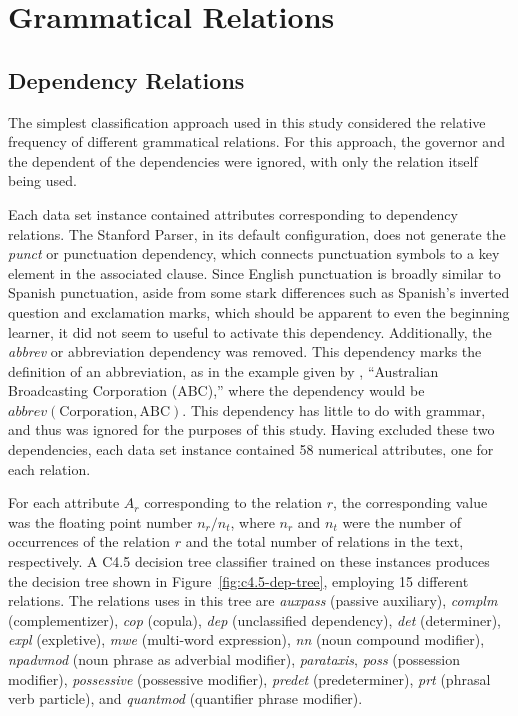 \documentclass[main.tex]{subfiles}
\begin{document}
\section{Grammatical Relations}
\setcounter{section}{5}

\subsection{Dependency Relations}

The simplest classification approach used in this study considered the relative frequency of different grammatical relations. For this approach, the governor and the dependent of the dependencies were ignored, with only the relation itself being used. 

Each data set instance contained attributes corresponding to dependency relations. The Stanford Parser, in its default configuration, does not generate the \textit{punct} or punctuation dependency, which connects punctuation symbols to a key element in the associated clause. Since English punctuation is broadly similar to Spanish punctuation, aside from some stark differences such as Spanish's inverted question and exclamation marks, which should be apparent to even the beginning learner, it did not seem to useful to activate this dependency. Additionally, the \textit{abbrev} or abbreviation dependency was removed. This dependency marks the definition of an abbreviation, as in the example given by \citet{typed-deps-manual}, ``Australian Broadcasting Corporation (ABC),'' where the dependency would be $abbrev(\text{Corporation},\text{ABC})$. This dependency has little to do with grammar, and thus was ignored for the purposes of this study. Having excluded these two dependencies, each data set instance contained 58 numerical attributes, one for each relation.

      For each attribute $A_r$ corresponding to the relation $r$, the corresponding value was the floating point number $n_r/n_t$, where $n_r$ and $n_t$ were the number of occurrences of the relation $r$ and the total number of relations in the text, respectively. A C4.5 decision tree classifier trained on these instances produces the decision tree shown in Figure~\ref{fig:c4.5-dep-tree}, employing 15 different relations. The relations uses in this tree are \textit{auxpass} (passive auxiliary), \textit{complm} (complementizer), \textit{cop} (copula), \textit{dep} (unclassified dependency), \textit{det} (determiner), \textit{expl} (expletive), \textit{mwe} (multi-word expression), \textit{nn} (noun compound modifier), \textit{npadvmod} (noun phrase as adverbial modifier), \textit{parataxis}, \textit{poss} (possession modifier), \textit{possessive} (possessive modifier), \textit{predet} (predeterminer), \textit{prt} (phrasal verb particle), and \textit{quantmod} (quantifier phrase modifier).
\end{document}

